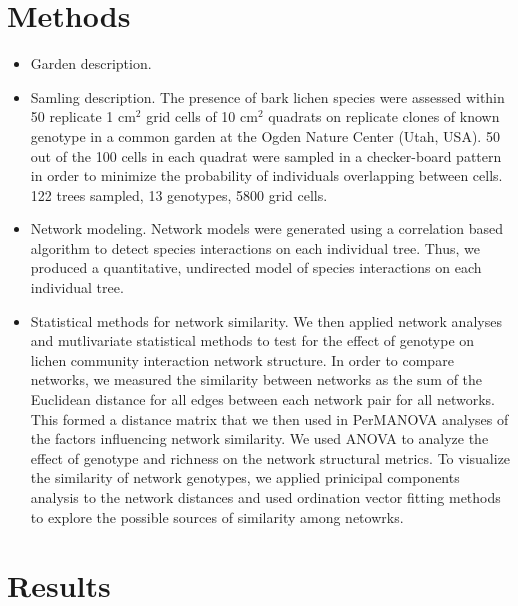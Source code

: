 \documentclass[11pt]{amsart}
\begin{document}
\section{Methods}
\begin{itemize}
\item Garden description. 
\item Samling description. The presence of bark lichen species were
  assessed within 50 replicate 1 cm$^2$ grid cells of 10 cm$^2$
  quadrats on replicate clones of known genotype in a  common garden
  at the Ogden Nature Center (Utah, USA). 50 out of the  100 cells in
  each quadrat were sampled in a checker-board pattern in  order to
  minimize the probability of individuals overlapping between
  cells. 122 trees sampled, 13 genotypes, 5800 grid cells.
\item Network modeling. Network models were generated using a
  correlation based algorithm to detect species interactions on each
  individual tree. Thus, we produced a quantitative, undirected model
  of species interactions on each individual tree.
\item Statistical methods for network similarity. We then applied
  network analyses and mutlivariate statistical methods to test for
  the effect of genotype on lichen community interaction network
  structure. In order to compare networks, we measured the similarity
  between networks as the sum of the Euclidean distance for all edges
  between each network pair for all networks. This formed a distance
  matrix that we then used in PerMANOVA analyses of the factors
  influencing network similarity. We used ANOVA to analyze the effect
  of genotype and richness on the network structural metrics. To
  visualize the similarity of network genotypes, we applied prinicipal
  components analysis to the network distances and used ordination
  vector fitting methods to explore the possible sources of similarity
  among netowrks. 
\end{itemize}

\section{Results}
\end{document}
